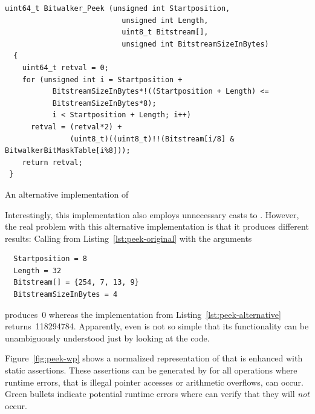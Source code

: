 \begin{listing}[hbt]
\begin{minipage}{\textwidth}
\begin{lstlisting}[style=acsl-block,frame=single]
  uint64_t Bitwalker_Peek (unsigned int Startposition,
                           unsigned int Length,
                           uint8_t Bitstream[],
                           unsigned int BitstreamSizeInBytes)
  {
    uint64_t retval = 0;
    for (unsigned int i = Startposition +
           BitstreamSizeInBytes*!((Startposition + Length) <=
           BitstreamSizeInBytes*8);
           i < Startposition + Length; i++)
      retval = (retval*2) +
               (uint8_t)((uint8_t)!!(Bitstream[i/8] & BitwalkerBitMaskTable[i%8]));
    return retval;
 }
\end{lstlisting}
\end{minipage}
\caption{\label{lst:peek-alternative} An alternative implementation of \peek}
\end{listing}

Interestingly, this implementation also employs unnecessary casts to .
However, the real problem with this alternative implementation is that it produces
different results: Calling \peek from Listing~\ref{lst:peek-original} with the arguments

\begin{verbatim}
  Startposition = 8
  Length = 32
  Bitstream[] = {254, 7, 13, 9}
  BitstreamSizeInBytes = 4
\end{verbatim}

produces~0 whereas the implementation from Listing~\ref{lst:peek-alternative} returns~118294784.
Apparently, even \peek is not so simple that its functionality can be unambiguously
understood just by looking at the code.


\clearpage

Figure~\ref{fig:peek-wp} shows a normalized representation of \peek
that is enhanced with static \acsl assertions.
These assertions can be generated by \framac for all operations where
runtime errors, that is illegal pointer accesses or arithmetic overflows, can occur.
Green bullets indicate potential runtime errors where \framacwp can verify
that they will \emph{not} occur.


